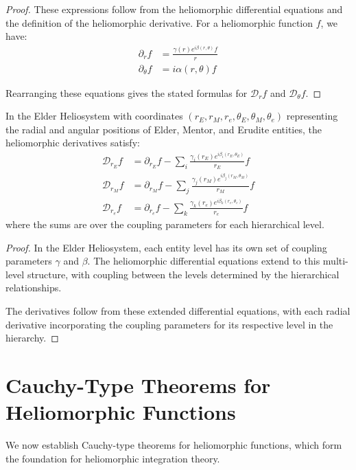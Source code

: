 \begin{proof}
These expressions follow from the heliomorphic differential equations and the definition of the heliomorphic derivative. For a heliomorphic function $f$, we have:
\begin{align}
\partial_rf &= \frac{\gamma(r)e^{i\beta(r,\theta)}f}{r}\\
\partial_\theta f &= i\alpha(r,\theta)f
\end{align}

Rearranging these equations gives the stated formulas for $\mathcal{D}_rf$ and $\mathcal{D}_\theta f$.
\end{proof}

\begin{theorem}
In the Elder Heliosystem with coordinates $(r_E, r_M, r_e, \theta_E, \theta_M, \theta_e)$ representing the radial and angular positions of Elder, Mentor, and Erudite entities, the heliomorphic derivatives satisfy:
\begin{align}
\mathcal{D}_{r_E}f &= \partial_{r_E}f - \sum_{i} \frac{\gamma_i(r_E)e^{i\beta_i(r_E,\theta_E)}}{r_E}f\\
\mathcal{D}_{r_M}f &= \partial_{r_M}f - \sum_{j} \frac{\gamma_j(r_M)e^{i\beta_j(r_M,\theta_M)}}{r_M}f\\
\mathcal{D}_{r_e}f &= \partial_{r_e}f - \sum_{k} \frac{\gamma_k(r_e)e^{i\beta_k(r_e,\theta_e)}}{r_e}f
\end{align}
where the sums are over the coupling parameters for each hierarchical level.
\end{theorem}

\begin{proof}
In the Elder Heliosystem, each entity level has its own set of coupling parameters $\gamma$ and $\beta$. The heliomorphic differential equations extend to this multi-level structure, with coupling between the levels determined by the hierarchical relationships.

The derivatives follow from these extended differential equations, with each radial derivative incorporating the coupling parameters for its respective level in the hierarchy.
\end{proof}

\section{Cauchy-Type Theorems for Heliomorphic Functions}

We now establish Cauchy-type theorems for heliomorphic functions, which form the foundation for heliomorphic integration theory.

